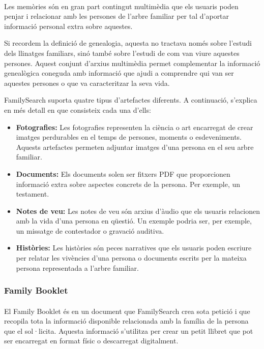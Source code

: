     \paragraph{}
    Les memòries són en gran part contingut multimèdia que els usuaris poden penjar i relacionar amb les persones de l'arbre familiar per tal d'aportar informació personal extra sobre aquestes.

    Si recordem la definició de genealogia, aquesta no tractava només sobre l'estudi dels llinatges familiars, sinó també sobre l'estudi de com van viure aquestes persones. Aquest conjunt d'arxius multimèdia permet complementar la informació genealògica coneguda amb informació que ajudi a comprendre qui van ser aquestes persones o que va caracteritzar la seva vida.

    FamilySearch suporta quatre tipus d'artefactes diferents. A continuació, s'explica en més detall en que consisteix cada una d'ells:

    \begin{itemize}
        \item \textbf{Fotografies:} Les fotografies representen la ciència o art encarregat de crear imatges perdurables en el temps de persones, moments o esdeveniments. A\-quests artefactes permeten adjuntar imatges d'una persona en el seu arbre familiar.
        \item \textbf{Documents:} Els documents solen ser fitxers PDF que proporcionen informació extra sobre aspectes concrets de la persona. Per exemple, un testament.
        \item \textbf{Notes de veu:} Les notes de veu són arxius d’àudio que els usuaris relacionen amb la vida d’una persona en qüestió. Un exemple podria ser, per exemple, un missatge de contestador o gravació auditiva.
        \item \textbf{Històries:} Les històries són peces narratives que els usuaris poden escriure per relatar les vivències d'una persona o documents escrits per la mateixa persona representada a l'arbre familiar.
    \end{itemize}


    \subsubsection{Family Booklet}

    \paragraph{}
    El Family Booklet és en un document que FamilySearch crea sota petició i que recopila tota la informació disponible relacionada amb la família de la persona que el sol·licita. Aquesta informació s'utilitza per crear un petit llibret que pot ser encarregat en format físic o descarregat digitalment.
